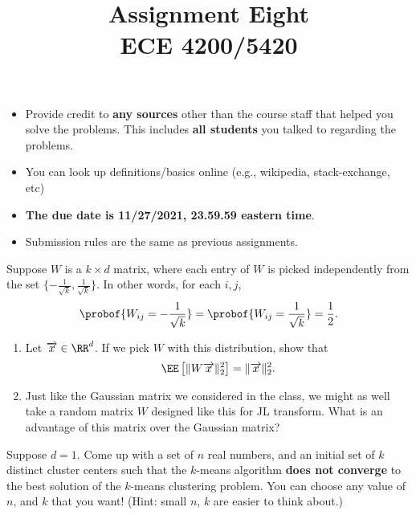 \documentclass[11pt]{article}
\title{Assignment Eight\\ ECE 4200/5420}
\date{}
\newenvironment{problem}[2][Problem]{\begin{trivlist}
\item[\hskip \labelsep {\bfseries #1}\hskip \labelsep {\bfseries #2.}]}{\end{trivlist}}
\begin{document}
\maketitle 

\begin{itemize}
\item
Provide credit to \textbf{any sources} other than the course staff that helped you solve the problems. This includes \textbf{all students} you talked to regarding the problems. 	
\item
You can look up definitions/basics online (e.g., wikipedia, stack-exchange, etc)
\item
{\bf The due date is 11/27/2021, 23.59.59 eastern time}. 
\item
Submission rules are the same as previous assignments.
\end{itemize}



\begin{problem}{1. (10 points)}
Suppose $W$ is a $k\times d$ matrix, where each entry of $W$ is picked independently from the set $\{-\frac1{\sqrt k},\frac1{\sqrt k}\}$. In other words, for each $i, j$, 
\[
\probof{W_{ij}=-\frac1{\sqrt k}}=\probof{W_{ij}=\frac1{\sqrt k}}=\frac12.
\]

\begin{enumerate}
\item 
Let $\overrightarrow x\in \RR^d$. If we pick $W$ with this distribution, show that
\[
\EE\left[\lVert W\overrightarrow x \rVert_2^2\right] = \lVert \overrightarrow x \rVert_2^2.
\]
\item
Just like the Gaussian matrix we considered in the class, we might as well take a random matrix $W$ designed like this for JL transform. What is an advantage of this matrix over the Gaussian matrix? 
\end{enumerate}
\end{problem}


\begin{problem}{2. (10 points)}
Suppose $d=1$. Come up with a set of $n$ real numbers, and an initial set of $k$ distinct cluster centers such that the $k$-means algorithm \textbf{does not converge} to the best solution of the $k$-means clustering problem. You can choose any value of $n$, and $k$ that you want! (Hint: small $n$, $k$ are easier to think about.)
\end{problem}
\end{document}
